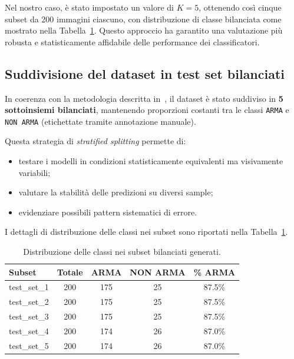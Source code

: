 Nel nostro caso, è stato impostato un valore di $K=5$, ottenendo così cinque subset da 200 immagini ciascuno, con distribuzione di classe bilanciata come mostrato nella Tabella~\ref{tab:class-dist}. Questo approccio ha garantito una valutazione più robusta e statisticamente affidabile delle performance dei classificatori.






\subsection{Suddivisione del dataset in test set bilanciati}
\label{subsec:balanced-testset}

In coerenza con la metodologia descritta in~\cite{phd_unisi_068552, nowroozi2020adversarial, s10472-019-09632-y}, il dataset è stato suddiviso in \textbf{5 sottoinsiemi bilanciati}, mantenendo proporzioni costanti tra le classi \texttt{ARMA} e \texttt{NON ARMA} (etichettate tramite annotazione manuale).

Questa strategia di \textit{stratified splitting} permette di:

\begin{itemize}
  \item testare i modelli in condizioni statisticamente equivalenti ma visivamente variabili;
  \item valutare la stabilità delle predizioni su diversi sample;
  \item evidenziare possibili pattern sistematici di errore.
\end{itemize}

I dettagli di distribuzione delle classi nei subset sono riportati nella Tabella~\ref{tab:class-dist}.

\begin{table}[H]
\centering
\begin{tabular}{lcccc}
\toprule
\textbf{Subset} & \textbf{Totale} & \textbf{ARMA} & \textbf{NON ARMA} & \textbf{\% ARMA} \\
\midrule
test\_set\_1 & 200 & 175 & 25 & 87.5\% \\
test\_set\_2 & 200 & 175 & 25 & 87.5\% \\
test\_set\_3 & 200 & 175 & 25 & 87.5\% \\
test\_set\_4 & 200 & 174 & 26 & 87.0\% \\
test\_set\_5 & 200 & 174 & 26 & 87.0\% \\
\bottomrule
\end{tabular}
\caption{Distribuzione delle classi nei subset bilanciati generati.}
\label{tab:class-dist}
\end{table}

